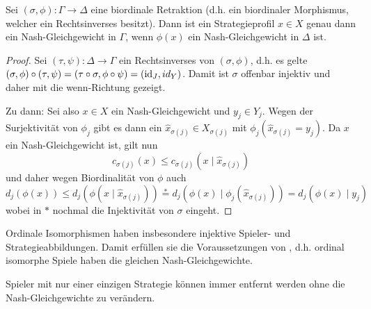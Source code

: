 \begin{prop}\label{prop:NGerhalten}
	Sei $(\sigma, \phi): \Gamma \to \Delta$ eine biordinale Retraktion (d.h. ein biordinaler Morphismus, welcher ein Rechtsinverses besitzt). Dann ist ein Strategieprofil $x \in X$ genau dann ein Nash-Gleichgewicht in $\Gamma$, wenn $\phi(x)$ ein Nash-Gleichgewicht in $\Delta$ ist.
\end{prop}

\begin{proof}
	Sei $(\tau, \psi): \Delta \to \Gamma$ ein Rechtsinverses von $(\sigma, \phi)$, d.h. es gelte $(\sigma, \phi) \circ (\tau, \psi) = (\tau\circ\sigma, \phi\circ\psi) = (\mathrm{id}_J, id_Y)$. Damit ist $\sigma$ offenbar injektiv und daher mit  die \glqq wenn\grqq-Richtung gezeigt.
	
	Zu \glqq dann\grqq: Sei also $x \in X$ ein Nash-Gleichgewicht und $y_j \in Y_j$. Wegen der Surjektivität von $\phi_j$ gibt es dann ein $\hat{x}_{\sigma(j)} \in X_{\sigma(j)}$ mit $\phi_j(\hat{x}_{\sigma(j)} = y_j)$. Da $x$ ein Nash-Gleichgewicht ist, gilt nun 
		\[c_{\sigma(j)}(x) \leq c_{\sigma(j)}(x \mid \hat{x}_{\sigma(j)})\]
	und daher wegen Biordinalität von $\phi$ auch 
		\[d_j(\phi(x)) \leq d_j(\phi(x \mid \hat{x}_{\sigma(j)})) \overset{\ast}{=} d_j(\phi(x) \mid \phi_j(\hat{x}_{\sigma(j)})) = d_j(\phi(x) \mid y_j)\]
	wobei in $\ast$ nochmal die Injektivität von $\sigma$ eingeht.
\end{proof}


\begin{bsp}
	Ordinale Isomorphismen haben insbesondere injektive Spieler- und Strategieabbildungen. Damit erfüllen sie die Voraussetzungen von , d.h. ordinal isomorphe Spiele haben die gleichen Nash-Gleichgewichte.
\end{bsp}

\begin{bsp}
	Spieler mit nur einer einzigen Strategie können immer entfernt werden ohne die Nash-Gleichgewichte zu verändern. 
	
\end{bsp}